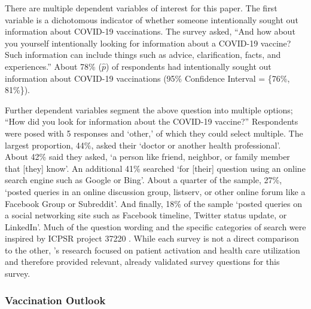 There are multiple dependent variables of interest for this paper. The first
variable is a dichotomous indicator of whether someone intentionally sought out
information about COVID-19 vaccinations. The survey asked, ``And how about you
yourself intentionally looking for information about a COVID-19 vaccine? Such
information can include things such as advice, clarification, facts, and
experiences.'' About 78\% (\(\widehat{p}\))
of respondents had intentionally sought out information about COVID-19
vaccinations (95\% Confidence Interval = \{76\%, 81\%\}).

Further dependent variables segment the above question into multiple options;
``How did you look for information about the COVID-19 vaccine?'' Respondents
were posed with 5 responses and `other,' of which they could select multiple.
The largest proportion, 44\%, asked their `doctor or another health
professional'. About 42\% said they asked, `a person like friend, neighbor, or
family member that [they] know'. An additional 41\% searched `for [their]
question using an online search engine such as Google or Bing'. About a quarter
of the sample, 27\%, `posted queries in an online discussion group, listserv, or
other online forum like a Facebook Group or Subreddit'. And finally, 18\% of the
sample `posted queries on a social networking site such as Facebook timeline,
Twitter status update, or LinkedIn'. Much of the question wording and the
specific categories of search were inspired by ICPSR project 37220
\citep{scanlon19}. While each survey is not a direct comparison to the other, \citet{scanlon19}'s 
research focused on patient activation and health care utilization 
and therefore provided relevant, already validated survey questions for this survey.

\hypertarget{vaccination-outlook}{\subsubsection{Vaccination Outlook}\label{vaccination-outlook}}

